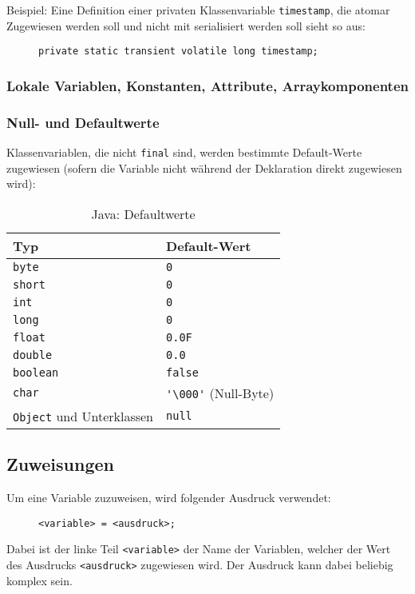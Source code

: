 		Beispiel: Eine Definition einer privaten Klassenvariable \texttt{timestamp}, die atomar Zugewiesen werden soll und nicht mit serialisiert werden soll sieht so aus:
		\begin{figure}[H]
			\centering
			\lstinline|private static transient volatile long timestamp;|
		\end{figure}
	
	\subsubsection{Lokale Variablen, Konstanten, Attribute, Arraykomponenten}
	
	\subsubsection{Null- und Defaultwerte}
		Klassenvariablen, die nicht \lstinline|final| sind, werden bestimmte Default-Werte zugewiesen (sofern die Variable nicht während der Deklaration direkt zugewiesen wird):
		\begin{table}[H]
			\centering
			\begin{tabular}{l | l}
				\textbf{Typ} & \textbf{Default-Wert} \\ \hline
				\lstinline|byte| & \lstinline|0| \\
				\lstinline|short| & \lstinline|0| \\
				\lstinline|int| & \lstinline|0| \\
				\lstinline|long| & \lstinline|0| \\
				\lstinline|float| & \lstinline|0.0F| \\
				\lstinline|double| & \lstinline|0.0| \\
				\lstinline|boolean| & \lstinline|false| \\
				\lstinline|char| & \lstinline|'\000'| (Null-Byte) \\
				\lstinline|Object| und Unterklassen & \lstinline|null| \\
			\end{tabular}
			\caption{Java: Defaultwerte}
		\end{table}

\subsection{Zuweisungen}
	
	Um eine Variable zuzuweisen, wird folgender Ausdruck verwendet:
	\begin{figure}[H]
		\centering
		\lstinline|<variable> = <ausdruck>;|
	\end{figure}
	Dabei ist der linke Teil \texttt{<variable>} der Name der Variablen, welcher der Wert des Ausdrucks \texttt{<ausdruck>} zugewiesen wird. Der Ausdruck kann dabei beliebig komplex sein.
	
